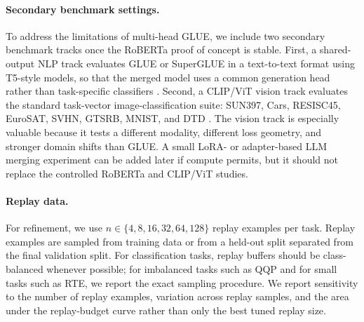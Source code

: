 \documentclass[11pt]{article}
\begin{document}
\paragraph{Secondary benchmark settings.}
To address the limitations of multi-head GLUE, we include two secondary benchmark tracks once the RoBERTa proof of concept is stable. First, a shared-output NLP track evaluates GLUE or SuperGLUE in a text-to-text format using T5-style models, so that the merged model uses a common generation head rather than task-specific classifiers \citep{wang2019superglue,raffel2020t5}. Second, a CLIP/ViT vision track evaluates the standard task-vector image-classification suite: SUN397, Cars, RESISC45, EuroSAT, SVHN, GTSRB, MNIST, and DTD \citep{radford2021clip,ilharco2022taskarithmetic,tang2024fusionbench}. The vision track is especially valuable because it tests a different modality, different loss geometry, and stronger domain shifts than GLUE. A small LoRA- or adapter-based LLM merging experiment can be added later if compute permits, but it should not replace the controlled RoBERTa and CLIP/ViT studies.

\paragraph{Replay data.}
For refinement, we use $n \in \{4,8,16,32,64,128\}$ replay examples per task. Replay examples are sampled from training data or from a held-out split separated from the final validation split. For classification tasks, replay buffers should be class-balanced whenever possible; for imbalanced tasks such as QQP and for small tasks such as RTE, we report the exact sampling procedure. We report sensitivity to the number of replay examples, variation across replay samples, and the area under the replay-budget curve rather than only the best tuned replay size.
\end{document}
